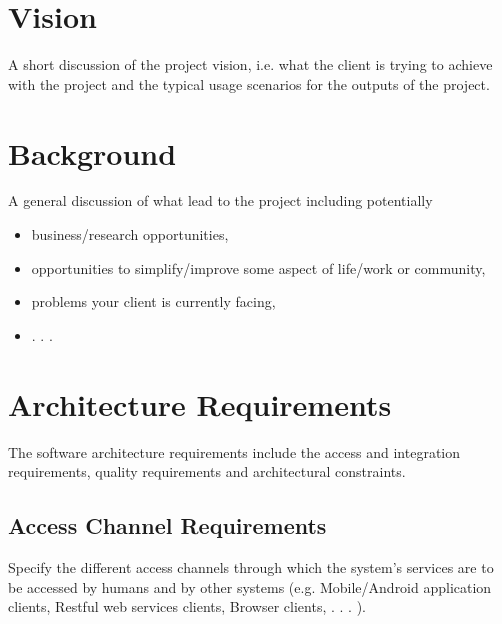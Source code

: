 \documentclass[a4paper,12pt]{article}
\begin{document}
\section{Vision}

A short discussion of the project vision, i.e. what the client is trying to achieve with the project
and the typical usage scenarios for the outputs of the project.

\section{Background}

A general discussion of what lead to the project including potentially
\begin{itemize}
\item business/research opportunities,
\item opportunities to simplify/improve some aspect of life/work or community,
\item problems your client is currently facing,
\item . . .
\end{itemize}

\section{Architecture Requirements}

The software architecture requirements include the access and integration requirements, quality
requirements and architectural constraints.

\subsection{Access Channel Requirements}

Specify the different access channels through which the system's services are to be accessed by
humans and by other systems (e.g. Mobile/Android application clients, Restful web services
clients, Browser clients, . . . ).
\end{document}
